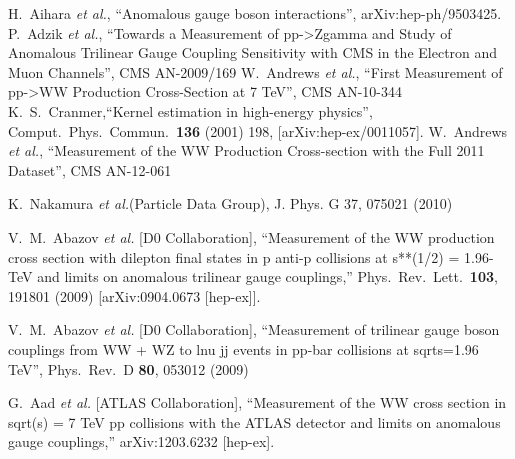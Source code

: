 \begin{thebibliography}{99}                                                                                                                               
  H.~Aihara {\it et al.}, ``Anomalous gauge boson interactions'',
  arXiv:hep-ph/9503425.
  P.~Adzik {\it et al.}, ``Towards a Measurement of pp->Zgamma and Study of Anomalous Trilinear Gauge Coupling Sensitivity with CMS in the Electron and Muon Channels'',
  CMS AN-2009/169
  W.~Andrews {\it et al.}, ``First Measurement of pp->WW Production Cross-Section at 7 TeV'',
  CMS AN-10-344
  K.~S.~Cranmer,``Kernel estimation in high-energy physics'',  Comput.\ Phys.\ Commun.\  {\bf 136} (2001) 198,  [arXiv:hep-ex/0011057].
W.~Andrews {\it et al.}, ``Measurement of the WW Production Cross-section with the Full 2011 Dataset'',
CMS AN-12-061

%
%

  K.~Nakamura {\it et al.}(Particle Data Group), J. Phys. G 37, 075021 (2010)

  V.~M.~Abazov {\it et al.}  [D0 Collaboration],
  ``Measurement of the WW production cross section with dilepton final states in p anti-p collisions at s**(1/2) = 1.96-TeV and limits on anomalous trilinear gauge couplings,''
  Phys.\ Rev.\ Lett.\  {\bf 103}, 191801 (2009)
  [arXiv:0904.0673 [hep-ex]].

  V.~M.~Abazov {\it et al.}  [D0 Collaboration], ``Measurement of trilinear gauge boson couplings from WW + WZ to lnu jj events in pp-bar collisions at sqrt{s}=1.96 TeV'',
  Phys.\ Rev.\  D {\bf 80}, 053012 (2009)

\bibitem{} 
  G.~Aad {\it et al.}  [ATLAS Collaboration],
  ``Measurement of the WW cross section in sqrt(s) = 7 TeV pp collisions with the ATLAS detector and limits on anomalous gauge couplings,''
  arXiv:1203.6232 [hep-ex].

\end{thebibliography}


